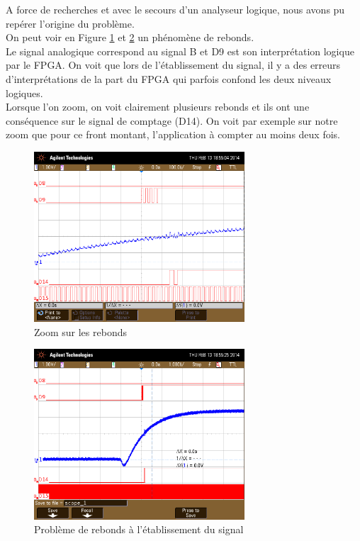 	A force de recherches et avec le secours d'un analyseur logique, nous avons pu repérer l'origine du problème.\\
	On peut voir en Figure \ref{img:zoomBounce} et \ref{img:Bounce} un phénomène de rebonds.\\ 
	Le signal analogique correspond au signal B et D9 est son interprétation logique par le FPGA. On voit que lors de l'établissement du signal, il y a des erreurs d'interprétations de la part du FPGA qui parfois confond les deux niveaux logiques.\\
	Lorsque l'on zoom, on voit clairement plusieurs rebonds et ils ont une conséquence sur le signal de comptage (D14). On voit par exemple sur notre zoom que pour ce front montant, l'application à compter au moins deux fois.\\
	
	\begin{figure}[h!]
  		\centering
  		\includegraphics[width=0.7\textwidth]{img/scope_0}
 		\caption{Zoom sur les rebonds}
  		\label{img:zoomBounce}
	\end{figure}	
	\begin{figure}[h!]
  		\centering
  		\includegraphics[width=0.7\textwidth]{img/scope_1}
 		\caption{Problème de rebonds à l'établissement du signal}
  		\label{img:Bounce}
	\end{figure}	
	
